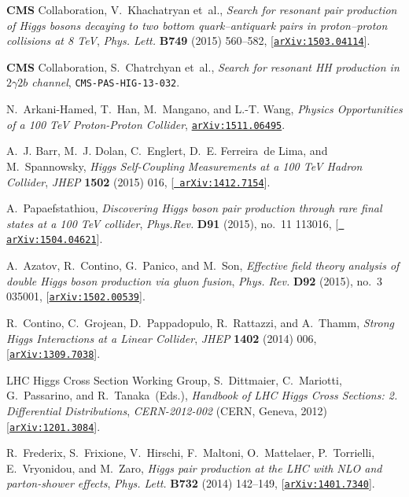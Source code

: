 \documentclass[a4paper,11pt]{article}
\begin{document}
\begin{thebibliography}{100}
{\bf CMS} Collaboration, V.~Khachatryan et~al., {\it {Search for resonant pair
  production of Higgs bosons decaying to two bottom quark–antiquark pairs in
  proton–proton collisions at 8 TeV}},  {\em Phys. Lett.} {\bf B749} (2015)
  560--582, [\href{http://arxiv.org/abs/1503.04114}{{\tt arXiv:1503.04114}}].

{\bf CMS} Collaboration, S.~Chatrchyan et~al., {\it {Search for resonant HH
  production in $2\gamma2b$ channel}}, {\tt CMS-PAS-HIG-13-032}.

N.~Arkani-Hamed, T.~Han, M.~Mangano, and L.-T. Wang, {\it {Physics
  Opportunities of a 100 TeV Proton-Proton Collider}},
  \href{http://arxiv.org/abs/1511.06495}{{\tt arXiv:1511.06495}}.

A.~J. Barr, M.~J. Dolan, C.~Englert, D.~E. Ferreira~de Lima, and M.~Spannowsky,
  {\it {Higgs Self-Coupling Measurements at a 100 TeV Hadron Collider}},  {\em
  JHEP} {\bf 1502} (2015) 016, [\href{http://arxiv.org/abs/1412.7154}{{\tt
  arXiv:1412.7154}}].

A.~Papaefstathiou, {\it {Discovering Higgs boson pair production through rare
  final states at a 100 TeV collider}},  {\em Phys.Rev.} {\bf D91} (2015),
  no.~11 113016, [\href{http://arxiv.org/abs/1504.04621}{{\tt
  arXiv:1504.04621}}].

A.~Azatov, R.~Contino, G.~Panico, and M.~Son, {\it {Effective field theory
  analysis of double Higgs boson production via gluon fusion}},  {\em Phys.
  Rev.} {\bf D92} (2015), no.~3 035001,
  [\href{http://arxiv.org/abs/1502.00539}{{\tt arXiv:1502.00539}}].

R.~Contino, C.~Grojean, D.~Pappadopulo, R.~Rattazzi, and A.~Thamm, {\it {Strong
  Higgs Interactions at a Linear Collider}},  {\em JHEP} {\bf 1402} (2014) 006,
  [\href{http://arxiv.org/abs/1309.7038}{{\tt arXiv:1309.7038}}].

{LHC Higgs Cross Section Working Group}, S.~Dittmaier, C.~Mariotti,
  G.~Passarino, and R.~Tanaka~(Eds.), {\it {Handbook of LHC Higgs Cross
  Sections: 2. Differential Distributions}},  {\em CERN-2012-002} (CERN,
  Geneva, 2012) [\href{http://arxiv.org/abs/1201.3084}{{\tt arXiv:1201.3084}}].

R.~Frederix, S.~Frixione, V.~Hirschi, F.~Maltoni, O.~Mattelaer, P.~Torrielli,
  E.~Vryonidou, and M.~Zaro, {\it {Higgs pair production at the LHC with NLO
  and parton-shower effects}},  {\em Phys. Lett.} {\bf B732} (2014) 142--149,
  [\href{http://arxiv.org/abs/1401.7340}{{\tt arXiv:1401.7340}}].


\end{thebibliography}
\end{document}
